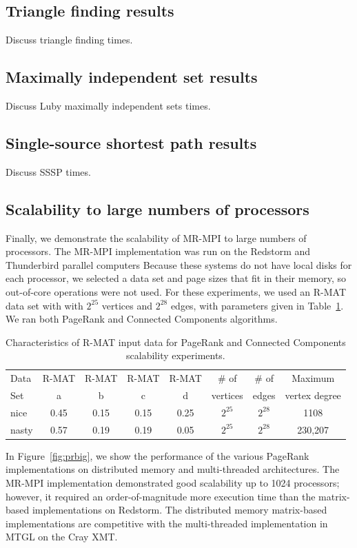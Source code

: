 \subsection{Triangle finding results}
Discuss triangle finding times.


\subsection{Maximally independent set results}
Discuss Luby maximally independent sets times.

\subsection{Single-source shortest path results}
Discuss SSSP times.

\subsection{Scalability to large numbers of processors}
Finally, we demonstrate the scalability of MR-MPI to large numbers of 
processors.  
The MR-MPI implementation was run on the Redstorm and Thunderbird
parallel computers
Because these systems do not have local disks for each processor, we selected 
a data set and page sizes that fit in their memory, so out-of-core operations
were not used.  For these experiments, we used an R-MAT data set with 
with $2^{25}$ vertices and $2^{28}$ edges, with parameters given in
Table~\ref{t:rmat}.  We ran both PageRank and Connected Components
algorithms.

\begin{table}
\begin{tabular}{|l|c|c|c|c|c|c|c|}
\hline
Data & R-MAT  & R-MAT  & R-MAT  & R-MAT  & \# of    & \# of & Maximum \\
Set  & a      & b      & c      & d      & vertices & edges & vertex degree\\
\hline
nice  & 0.45 & 0.15 & 0.15 & 0.25 & $2^{25}$ & $2^{28}$ & 1108 \\
nasty & 0.57 & 0.19 & 0.19 & 0.05 & $2^{25}$ & $2^{28}$ & 230,207\\
\hline
\end{tabular}
\caption{Characteristics of R-MAT input data for PageRank and Connected
Components scalability experiments.}
\label{t:rmat}
\end{table}

In Figure~\ref{fig:prbig}, we show the performance 
of the various PageRank
implementations on distributed memory and multi-threaded architectures.
The MR-MPI implementation demonstrated good scalability up to 1024 processors; 
however, it required an order-of-magnitude
more execution time than the matrix-based implementations on Redstorm.  
The distributed memory matrix-based
implementations are competitive with the multi-threaded implementation
in MTGL on the Cray XMT.

